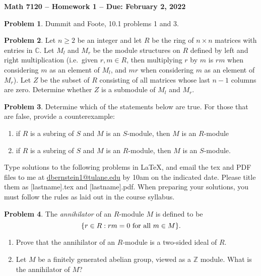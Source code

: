 \documentclass[letterpaper,11pt]{amsart}
\theoremstyle{plain}
\theoremstyle{definition}
\newtheorem{pr}{Problem}
\theoremstyle{remark}
\begin{document}
\Large

\begin{center}
{\bf Math 7120 -- Homework  1 --  Due:  February 2, 2022}
\end{center}

\normalsize



\medskip


\begin{pr}
    Dummit and Foote, 10.1 problems 1 and 3.
\end{pr}


\begin{pr}
    Let $n \ge 2$ be an integer and let $R$ be the ring of $n\times n$ matrices with entries in $\mathbb{C}$.
    Let $M_l$ and $M_r$ be the module structures on $R$ defined by left and right multiplication (i.e.~given $r,m \in R$, then multiplying $r$ by $m$ is $rm$ when considering $m$ as an element of $M_l$, and $mr$ when considering $m$ as an element of $M_r$).
    Let $Z$ be the subset of $R$ consisting of all matrices whose last $n-1$ columns are zero.
    Determine whether $Z$ is a submodule of $M_l$ and $M_r$.
\end{pr}

\begin{pr}
    Determine which of the statements below are true. For those that are false, provide a counterexample:
    \begin{enumerate}
        \item if $R$ is a subring of $S$ and $M$ is an $S$-module, then $M$ is an $R$-module
        \item if $R$ is a subring of $S$ and $M$ is an $R$-module, then $M$ is an $S$-module.
    \end{enumerate}
\end{pr}

\bigskip

Type solutions to the following problems in \LaTeX, and email the tex and PDF files to me at \url{dbernstein1@tulane.edu} by 10am on the indicated date.
Please title them as [lastname].tex and [lastname].pdf.
When preparing your solutions, you must follow the rules as laid out in the course syllabus.

\vspace{.5cm}


\begin{pr}
    The \emph{annihilator} of an $R$-module $M$ is defined to be
    \[
        \{r \in R : rm = 0 \ {\rm for \ all} \ m \in M\}.
    \]
    \begin{enumerate}
        \item Prove that the annihilator of an $R$-module is a two-sided ideal of $R$.
        \item Let $M$ be a finitely generated abelian group, viewed as a $\mathbb{Z}$ module. What is the annihilator of $M$?
    \end{enumerate}
\end{pr}
\end{document}
